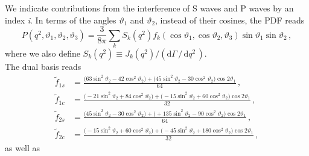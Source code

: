 \documentclass[aps,prd,reprint,nofootinbib,preprintnumbers]{revtex4}
\newcommand{\dual}[1]{\tilde{#1}}
\newcommand{\rmdx}[1]{\mbox{d} #1 \,} %
\renewcommand{\theta}{\vartheta}
\begin{document}
We indicate contributions from the interference of S waves and P waves by an index \emph{i}. In terms of the angles $\theta_1$ and $\theta_2$, instead of their cosines, the PDF reads
\begin{equation}
    P(q^2, \theta_1, \theta_2, \theta_3) = \frac{3}{8\pi} \sum_k S_k(q^2) f_k(\cos\theta_1, \cos\theta_2, \theta_3) \sin\theta_1 \sin\theta_2\,,
\end{equation}
where we also define $S_k(q^2) \equiv J_k(q^2) / (\rmdx{\Gamma} /\, \rmdx{q^2})$.\\

The dual basis reads
\begin{equation}
\begin{aligned}
    \dual{f}_{1s} & = \frac{\big( 63 \sin^2\theta_2 - 42 \cos^2\theta_2\big) + \big(  45 \sin^2\theta_2 - 30 \cos^2\theta_2\big)\cos 2\theta_1}{64} \,,\\
    \dual{f}_{1c} & = \frac{\big(-21 \sin^2\theta_2 + 84 \cos^2\theta_2\big) + \big( -15 \sin^2\theta_2 + 60 \cos^2\theta_2\big)\cos 2\theta_1}{32} \,,\\
    \dual{f}_{2s} & = \frac{\big( 45 \sin^2\theta_2 - 30 \cos^2\theta_2\big) + \big(+135 \sin^2\theta_2 - 90 \cos^2\theta_2\big)\cos 2\theta_1}{64} \,,\\
    \dual{f}_{2c} & = \frac{\big(-15 \sin^2\theta_2 + 60 \cos^2\theta_2\big) + \big( -45 \sin^2\theta_2 +180 \cos^2\theta_2\big)\cos 2\theta_1}{32} \,,
\end{aligned}
\end{equation}
as well as
\end{document}
